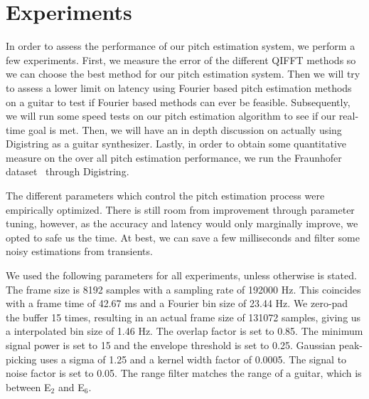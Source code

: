 \documentclass[a4paper,10pt,twocolumn]{article}
\newcommand{\note}[2]{#1${}_{#2}$}
\begin{document}




\section{Experiments}  \label{sec:exp}
In order to assess the performance of our pitch estimation system, we perform a few experiments. First, we measure the error of the different QIFFT methods so we can choose the best method for our pitch estimation system. Then we will try to assess a lower limit on latency using Fourier based pitch estimation methods on a guitar to test if Fourier based methods can ever be feasible. Subsequently, we will run some speed tests on our pitch estimation algorithm to see if our real-time goal is met. Then, we will have an in depth discussion on actually using Digistring as a guitar synthesizer. Lastly, in order to obtain some quantitative measure on the over all pitch estimation performance, we run the Fraunhofer dataset~\cite{dataset} through Digistring.

The different parameters which control the pitch estimation process were empirically optimized. There is still room from improvement through parameter tuning, however, as the accuracy and latency would only marginally improve, we opted to safe us the time. At best, we can save a few milliseconds and filter some noisy estimations from transients.

We used the following parameters for all experiments, unless otherwise is stated. The frame size is 8192 samples with a sampling rate of 192000 Hz. This coincides with a frame time of 42.67 ms and a Fourier bin size of 23.44 Hz. We zero-pad the buffer 15 times, resulting in an actual frame size of 131072 samples, giving us a interpolated bin size of 1.46 Hz. The overlap factor is set to 0.85. The minimum signal power is set to 15 and the envelope threshold is set to 0.25. Gaussian peak-picking uses a sigma of 1.25 and a kernel width factor of 0.0005. The signal to noise factor is set to 0.05. The range filter matches the range of a guitar, which is between \note{E}{2} and \note{E}{6}.
\end{document}
